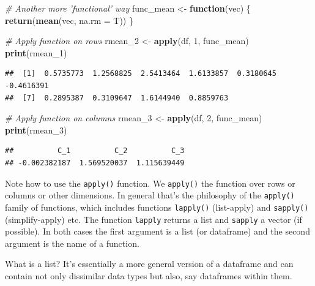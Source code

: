 \documentclass[12pt,]{article}
\newenvironment{Shaded}{\begin{snugshade}}{\end{snugshade}}
\newcommand{\KeywordTok}[1]{\textcolor[rgb]{0.13,0.29,0.53}{\textbf{#1}}}
\newcommand{\DataTypeTok}[1]{\textcolor[rgb]{0.13,0.29,0.53}{#1}}
\newcommand{\DecValTok}[1]{\textcolor[rgb]{0.00,0.00,0.81}{#1}}
\newcommand{\StringTok}[1]{\textcolor[rgb]{0.31,0.60,0.02}{#1}}
\newcommand{\CommentTok}[1]{\textcolor[rgb]{0.56,0.35,0.01}{\textit{#1}}}
\newcommand{\ControlFlowTok}[1]{\textcolor[rgb]{0.13,0.29,0.53}{\textbf{#1}}}
\newcommand{\NormalTok}[1]{#1}
\begin{document}
\begin{Shaded}
\begin{Highlighting}[]
\CommentTok{# Another more 'functional' way}
\NormalTok{func_mean <-}\StringTok{ }\ControlFlowTok{function}\NormalTok{(vec)}
\NormalTok{\{}
  \KeywordTok{return}\NormalTok{(}\KeywordTok{mean}\NormalTok{(vec, }\DataTypeTok{na.rm =}\NormalTok{ T))}
\NormalTok{\}}

\CommentTok{# Apply function on rows}
\NormalTok{rmean_}\DecValTok{2}\NormalTok{ <-}\StringTok{ }\KeywordTok{apply}\NormalTok{(df, }\DecValTok{1}\NormalTok{, func_mean) }
\KeywordTok{print}\NormalTok{(rmean_}\DecValTok{1}\NormalTok{)}
\end{Highlighting}
\end{Shaded}

\begin{verbatim}
##  [1]  0.5735773  1.2568825  2.5413464  1.6133857  0.3180645 -0.4616391
##  [7]  0.2895387  0.3109647  1.6144940  0.8859763
\end{verbatim}

\begin{Shaded}
\begin{Highlighting}[]
\CommentTok{# Apply function on columns}
\NormalTok{rmean_}\DecValTok{3}\NormalTok{ <-}\StringTok{ }\KeywordTok{apply}\NormalTok{(df, }\DecValTok{2}\NormalTok{, func_mean)}
\KeywordTok{print}\NormalTok{(rmean_}\DecValTok{3}\NormalTok{)}
\end{Highlighting}
\end{Shaded}

\begin{verbatim}
##          C_1          C_2          C_3 
## -0.002382187  1.569520037  1.115639449
\end{verbatim}

Note how to use the \texttt{apply()} function. We \texttt{apply()} the
function over rows or columns or other dimensions. In general that's the
philosophy of the \texttt{apply()} family of functions, which includes
functions \texttt{lapply()} (list-apply) and \texttt{sapply()}
(simplify-apply) etc. The function \texttt{lapply} returns a list and
\texttt{sapply} a vector (if possible). In both cases the first argument
is a list (or dataframe) and the second argument is the name of a
function.

What is a list? It's essentially a more general version of a dataframe
and can contain not only dissimilar data types but also, say dataframes
within them.
\end{document}
